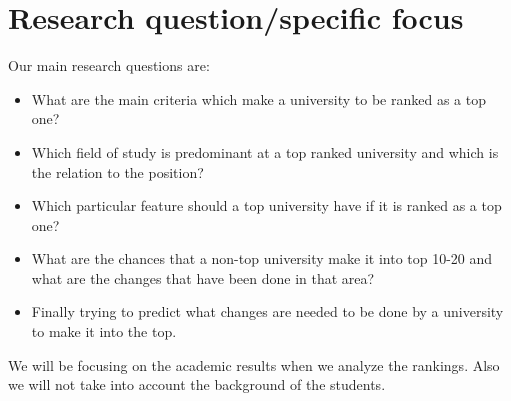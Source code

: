 \section{Research question/specific focus}
Our main research questions are:
\begin{itemize}
	\item What are the main criteria which make a university to be ranked as a top one?
	\item Which field of study is predominant at a top ranked university and which is the relation to the position?
	\item Which particular feature should a top university have if it is ranked as a top one?
	\item What are the chances that a non-top university make it into top 10-20 and what are the changes that have been done in that area?
	\item Finally trying to predict what changes are needed to be done by a university to make it into the top.
\end{itemize}

We will be focusing on the academic results when we analyze the rankings. Also we will not take into account the background of the students.